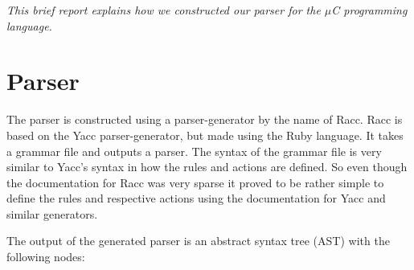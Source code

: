 \textit{This brief report explains how we constructed our parser for the $\mu$C programming language.}

\section{Parser}
The parser is constructed using a parser-generator by the name of Racc. Racc is based on the Yacc parser-generator, but made using the Ruby language. It takes a grammar file and outputs a parser. The syntax of the grammar file is very similar to Yacc's syntax in how the rules and actions are defined. So even though the documentation for Racc was very sparse it proved to be rather simple to define the rules and respective actions using the documentation for Yacc and similar generators.

The output of the generated parser is an abstract syntax tree (AST) with the following nodes:

